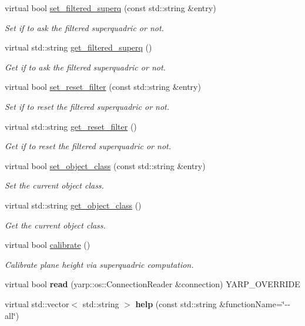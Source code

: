 \begin{DoxyCompactItemize}
virtual bool \hyperlink{classgraspDemo__IDL_afd4e51de3917fe3a5caaf160459ac54d}{set\+\_\+filtered\+\_\+superq} (const std\+::string \&entry)
\begin{DoxyCompactList}\small\item\em Set if to ask the filtered superquadric or not. \end{DoxyCompactList}\item 
virtual std\+::string \hyperlink{classgraspDemo__IDL_a17792a60708878e1962b9068eac6451d}{get\+\_\+filtered\+\_\+superq} ()
\begin{DoxyCompactList}\small\item\em Get if to ask the filtered superquadric or not. \end{DoxyCompactList}\item 
virtual bool \hyperlink{classgraspDemo__IDL_a15203d03a49ac4225a2401b2b0428960}{set\+\_\+reset\+\_\+filter} (const std\+::string \&entry)
\begin{DoxyCompactList}\small\item\em Set if to reset the filtered superquadric or not. \end{DoxyCompactList}\item 
virtual std\+::string \hyperlink{classgraspDemo__IDL_a13d16f7545403a90df04a5a1e0faa14b}{get\+\_\+reset\+\_\+filter} ()
\begin{DoxyCompactList}\small\item\em Get if to reset the filtered superquadric or not. \end{DoxyCompactList}\item 
virtual bool \hyperlink{classgraspDemo__IDL_ad05df16c2b205b0eb5f9338de63d89b4}{set\+\_\+object\+\_\+class} (const std\+::string \&entry)
\begin{DoxyCompactList}\small\item\em Set the current object class. \end{DoxyCompactList}\item 
virtual std\+::string \hyperlink{classgraspDemo__IDL_a66d89e8ebe9f764fbdd9d95bb0191b94}{get\+\_\+object\+\_\+class} ()
\begin{DoxyCompactList}\small\item\em Get the current object class. \end{DoxyCompactList}\item 
virtual bool \hyperlink{classgraspDemo__IDL_a7b718062e0170fe1520a05b441aaecc8}{calibrate} ()
\begin{DoxyCompactList}\small\item\em Calibrate plane height via superquadric computation. \end{DoxyCompactList}\item 
virtual bool {\bfseries read} (yarp\+::os\+::\+Connection\+Reader \&connection) Y\+A\+R\+P\+\_\+\+O\+V\+E\+R\+R\+I\+DE\label{classgraspDemo__IDL_abb26b6731fe87c79de367ae824db7483}

\item 
virtual std\+::vector$<$ std\+::string $>$ {\bfseries help} (const std\+::string \&function\+Name=\char`\"{}-\/-\/all\char`\"{})\label{classgraspDemo__IDL_a952412e2b4df1068fa5ed0f9c2894ac5}

\end{DoxyCompactItemize}


